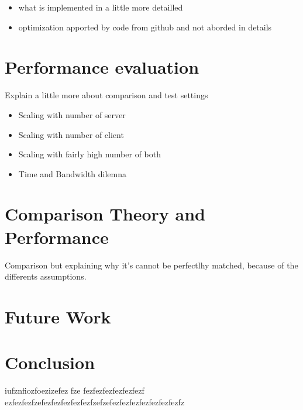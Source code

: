 \documentclass{article}
\begin{document}
\begin{itemize}

\item what is implemented in a little more detailled
\item optimization apported by code from github and not aborded in details

\end{itemize}


\section{Performance evaluation}

Explain a little more about comparison and test settings


\begin{itemize}


\item Scaling with number of server
\item Scaling with number of client
\item Scaling with fairly high number of both 
\item Time and Bandwidth dilemna

\end{itemize}


\section{Comparison Theory and Performance}
Comparison but explaining why it's cannot be perfectlhy matched, because of the differents assumptions.

\section{Future Work}

\newpage
\section*{Conclusion}
iufznfiozfoezizefez fze
fezfezfezfezfezfezf
ezfezfezfzefezfezfezfezfezfzefzefezfezfezfezfezfezfezfz
\end{document}

